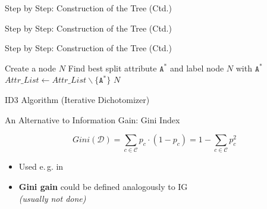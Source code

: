 \begin{frame}{Step by Step: Construction of the Tree (Ctd.)}{}
	
\end{frame}


\begin{frame}{Step by Step: Construction of the Tree (Ctd.)}{}
	
\end{frame}


\begin{frame}{Step by Step: Construction of the Tree (Ctd.)}{}
	
\end{frame}


\begin{frame}[plain]{}{}
	\begin{algorithm}[H]
		\DontPrintSemicolon
		\footnotesize
		Create a node $N$\;
		Find best split attribute $\texttt{A}^*$ and label node $N$ with $\texttt{A}^*$\;
		$Attr\_List \longleftarrow Attr\_List \backslash \{ \texttt{A}^* \}$\;
		\Return $N$
 		\caption{ID3 Algorithm (Iterative Dichotomizer)}
	\end{algorithm}
\end{frame}


\begin{frame}{An Alternative to Information Gain: Gini Index}{}
	\begin{boxBlueNoFrame}
		\begin{equation}
			Gini(\mathcal{D})
				= \sum_{c \in \mathcal{C}} p_c \cdot (1 - p_c)
				= 1 -  \sum_{c \in \mathcal{C}} p_c^2
		\end{equation}
	\end{boxBlueNoFrame}
	\begin{itemize}
		\item Used e.\,g. in 
		\item \textbf{Gini gain} could be defined analogously to IG \\
			{\footnotesize \textit{(usually not done)}}
	\end{itemize}
\end{frame}


